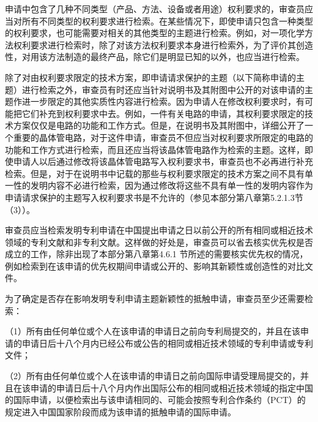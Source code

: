 申请中包含了几种不同类型（产品、方法、设备或者用途）权利要求的，审查员应当对所有不同类型的权利要求进行检索。在某些情况下，即使申请只包含一种类型的权利要求，也可能需要对相关的其他类型的主题进行检索。例如，对一项化学方法权利要求进行检索时，除了对该方法权利要求本身进行检索外，为了评价其创造性，对用该方法制造的最终产品，除它们是明显已知的以外，也应当进行检索。

除了对由权利要求限定的技术方案，即申请请求保护的主题（以下简称申请的主题）进行检索之外，审查员有时还应当针对说明书及其附图中公开的对该申请的主题作进一步限定的其他实质性内容进行检索。因为申请人在修改权利要求时，有可能把它们补充到权利要求中去。例如，一件有关电路的申请，其权利要求限定的技术方案仅仅是电路的功能和工作方式。但是，在说明书及其附图中，详细公开了一个重要的晶体管电路，对于这件申请，审查员不但应当对权利要求所限定的电路的功能和工作方式进行检索，而且还应当将该晶体管电路作为检索的主题。这样，即使申请人以后通过修改将该晶体管电路写入权利要求书，审查员也不必再进行补充检索。但是，对于在说明书中记载的那些与权利要求限定的技术方案之间不具有单一性的发明内容不必进行检索，因为通过修改将这些不具有单一性的发明内容作为申请请求保护的主题写入权利要求书是不允许的（参见本部分第八章第5.2.1.3节（3））。

审查员应当检索发明专利申请在中国提出申请之日以前公开的所有相同或相近技术领域的专利文献和非专利文献。这样做的好处是，审查员可以省去核实优先权是否成立的工作，除非出现了本部分第八章第4.6.1 节所述的需要核实优先权的情况，例如检索到在该申请的优先权期间申请或公开的、影响其新颖性或创造性的对比文件。

为了确定是否存在影响发明专利申请主题新颖性的抵触申请，审查员至少还需要检索：

{\setlength{\parindent}{17.1bp}（1）所有由任何单位或个人在该申请的申请日之前向专利局提交的，并且在该申请的申请日后十八个月内已经公布或公告的相同或相近技术领域的专利申请或专利文件；\par}

{\setlength{\parindent}{17.1bp}（2）所有由任何单位或个人在该申请的申请日之前向国际申请受理局提交的，并且在该申请的申请日后十八个月内作出国际公布的相同或相近技术领域的指定中国的国际申请，以便检索出与该申请相同的、可能会按照专利合作条约（PCT）的规定进入中国国家阶段而成为该申请的抵触申请的国际申请。\par}

